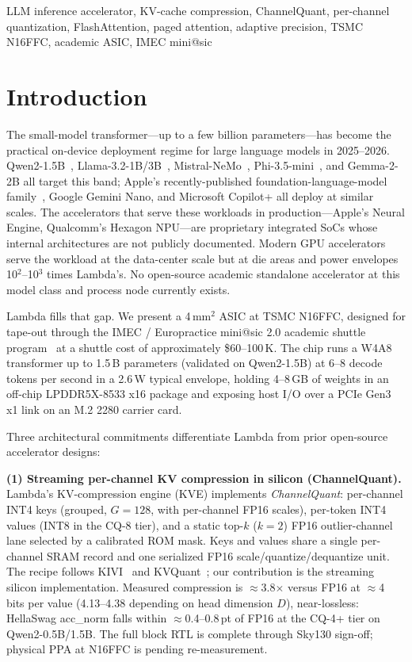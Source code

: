 \documentclass[conference]{IEEEtran}
\begin{document}
\begin{IEEEkeywords}
LLM inference accelerator, KV-cache compression, ChannelQuant, per-channel quantization, FlashAttention, paged attention, adaptive precision, TSMC N16FFC, academic ASIC, IMEC mini@sic
\end{IEEEkeywords}

\section{Introduction}

The small-model transformer---up to a few billion parameters---has become the practical on-device deployment regime for large language models in 2025--2026. Qwen2-1.5B~\cite{qwen25}, Llama-3.2-1B/3B~\cite{llama3}, Mistral-NeMo~\cite{mistral_nemo}, Phi-3.5-mini~\cite{phi35}, and Gemma-2-2B all target this band; Apple's recently-published foundation-language-model family~\cite{apple_foundation}, Google Gemini Nano, and Microsoft Copilot+ all deploy at similar scales. The accelerators that serve these workloads in production---Apple's Neural Engine, Qualcomm's Hexagon NPU---are proprietary integrated SoCs whose internal architectures are not publicly documented. Modern GPU accelerators~\cite{nvidia_ampere,nvidia_hopper,nvidia_blackwell} serve the workload at the data-center scale but at die areas and power envelopes 10$^2$--10$^3$ times Lambda's. No open-source academic standalone accelerator at this model class and process node currently exists.

Lambda fills that gap. We present a 4\,mm$^2$ ASIC at TSMC N16FFC, designed for tape-out through the IMEC / Europractice mini@sic 2.0 academic shuttle program~\cite{imec_minisic} at a shuttle cost of approximately \$60--100\,K. The chip runs a W4A8 transformer up to 1.5\,B parameters (validated on Qwen2-1.5B) at 6--8 decode tokens per second in a 2.6\,W typical envelope, holding 4--8\,GB of weights in an off-chip LPDDR5X-8533 x16 package and exposing host I/O over a PCIe Gen3 x1 link on an M.2 2280 carrier card.

Three architectural commitments differentiate Lambda from prior open-source accelerator designs:

\textbf{(1) Streaming per-channel KV compression in silicon (ChannelQuant).} Lambda's KV-compression engine (KVE) implements \emph{ChannelQuant}: per-channel INT4 keys (grouped, $G{=}128$, with per-channel FP16 scales), per-token INT4 values (INT8 in the CQ-8 tier), and a static top-$k$ ($k{=}2$) FP16 outlier-channel lane selected by a calibrated ROM mask. Keys and values share a single per-channel SRAM record and one serialized FP16 scale/quantize/dequantize unit. The recipe follows KIVI~\cite{kivi} and KVQuant~\cite{kvquant}; our contribution is the streaming silicon implementation. Measured compression is $\approx$3.8$\times$ versus FP16 at $\approx$4 bits per value (4.13--4.38 depending on head dimension $D$), near-lossless: HellaSwag acc\_norm falls within $\approx$0.4--0.8\,pt of FP16 at the CQ-4+ tier on Qwen2-0.5B/1.5B. The full block RTL is complete through Sky130 sign-off; physical PPA at N16FFC is pending re-measurement.
\end{document}

